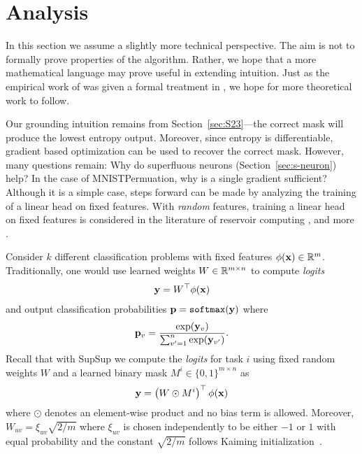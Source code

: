 \documentclass{article}
\newcommand{\ac}{SupSup\xspace}
\begin{document}
\section{Analysis} \label{sec:analysis}

In this section we assume a slightly more technical perspective. The aim is not to formally prove properties of the algorithm. Rather, we hope that a more mathematical language may prove useful in extending intuition. Just as the empirical work of \cite{frankle2018lottery, zhou2019deconstructing, ramanujan2019s} was given a formal treatment in \cite{malach2020proving}, we hope for more theoretical work to follow.

Our grounding intuition remains from Section~\ref{sec:S23}---the correct mask will produce the lowest entropy output. Moreover, since entropy is differentiable, gradient based optimization can be used to recover the correct mask. However, many questions remain: Why do superfluous neurons (Section~\ref{sec:s-neuron}) help? In the case of MNISTPermuation, why is a single gradient sufficient? Although it is a simple case, steps forward can be made by analyzing the training of a linear head on fixed features. With \textit{random} features, training a linear head on fixed features is considered in the literature of reservoir computing \cite{schrauwen2007overview}, and more \cite{bengio2006convex}.

Consider $k$ different classification problems with fixed features $\phi(\mathbf{x}) \in \mathbb{R}^m$. Traditionally, one would use learned weights $W \in \mathbb{R}^{m \times n}$ to compute \textit{logits}
\begin{align}
    \mathbf{y} = W^\top \phi(\mathbf{x})
\end{align}
and output classification probabilities $\mathbf{p} = \texttt{softmax}(\mathbf{y})$ where
\begin{align}
    \mathbf{p}_v = \frac{\exp(\mathbf{y}_v)}{\sum_{v' = 1}^n \exp(\mathbf{y}_{v'})}.
\end{align}
Recall that with \ac we compute the \textit{logits} for task $i$ using fixed random weights $W$ and a learned binary mask $M^i \in \{0,1\}^{m \times n}$ as
\begin{align}
    \mathbf{y} = \left( W \odot M^i \right)^\top \phi(\mathbf{x})
\end{align}
where $\odot$ denotes an element-wise product and no bias term is allowed. Moreover, $W_{uv} =  \xi_{uv} \sqrt{{2} /{m}} $ where $\xi_{uv}$ is chosen independently to be either $-1$ or $1$ with equal probability and the constant $\sqrt{{2} /{m}}$ follows Kaiming initialization~\cite{he2015delving}.
\end{document}
